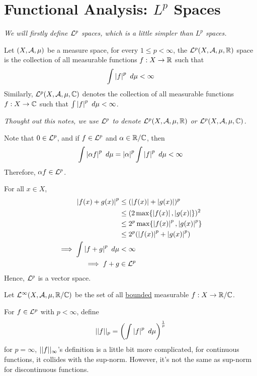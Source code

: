 \documentclass[11pt]{article}
\begin{document}
	\section{Functional Analysis: $L^p$ Spaces}
	\emph{We will firstly define $\mathcal{{L}}^p$ spaces, which is a little simpler than $L^p$ spaces.}
	\begin{definition}
		Let $(X, \mathcal{{A}}, \mu)$ be a measure space, for every $1 \leq p < \infty$, the $\mathcal{{L}}^p(X, \mathcal{{A}}, \mu, \mathbb{R})$ space is the collection of all measurable functions $f: X \to \mathbb{R}$ such that
		\begin{align}
			\int \left \vert {f} \right \vert^p\ d\mu < \infty
		\end{align}
		Similarly, $\mathcal{{L}}^p(X, \mathcal{{A}}, \mu, \mathbb{C})$ denotes the collection of all measurable functions $f: X \to \mathbb{C}$ such that $\int \left \vert {f} \right \vert^p\ d\mu < \infty$.
	\end{definition}
	\emph{Thought out this notes, we use $\mathcal{{L}}^p$ to denote $\mathcal{{L}}^p(X, \mathcal{{A}}, \mu, \mathbb{R})$ or $\mathcal{{L}}^p(X, \mathcal{{A}}, \mu, \mathbb{C})$.}
	\begin{proposition}
		Note that $0 \in \mathcal{{L}}^p$, and if $f \in \mathcal{{L}}^p$ and $\alpha \in \mathbb{R}/\mathbb{C}$, then
		\begin{align}
			\int \abs{\alpha f}^p\ d\mu = \abs{\alpha}^p \int \abs{f}^p\ d\mu < \infty
		\end{align}
		Therefore, $\alpha f \in \mathcal{{L}}^p$.
		
		For all $x \in X$,
		\begin{align}
			\left \vert {f(x) + g(x)} \right \vert^p &\leq (\left \vert {f(x)} \right \vert + \left \vert {g(x)} \right \vert)^p \\
			&\leq (2 \max\{\left \vert {f(x)} \right \vert, \left \vert {g(x)} \right \vert\})^2 \\
			&\leq 2^p \max\{\left \vert {f(x)} \right \vert^p, \left \vert {g(x)} \right \vert^p\} \\
			&\leq 2^p (\left \vert {f(x)} \right \vert^p + \left \vert {g(x)} \right \vert^p) \\
			\implies \int \left \vert {f+g} \right \vert^p\ d\mu &< \infty \\
			\implies f + g &\in \mathcal{{L}}^p
		\end{align}
		Hence, $\mathcal{{L}}^p$ is a vector space.
	\end{proposition}
	
	\begin{definition}
		Let $\mathcal{{L}}^\infty(X, \mathcal{{A}}, \mu, \mathbb{R}/\mathbb{C})$ be the set of all \ul{bounded} measurable $f: X \to \mathbb{R}/\mathbb{C}$.
	\end{definition}
	
	\begin{definition}
		For $f \in \mathcal{{L}}^p$ with $p < \infty$, define
		\begin{align}
			\vert \vert {f} \vert \vert_p = \left(\int \left \vert {f} \right \vert^p\ d\mu \right)^{\frac{1}{p}}
		\end{align}
		for $p = \infty$, $\vert \vert {f} \vert \vert_\infty$'s definition is a little bit more complicated, for continuous functions, it collides with the sup-norm. However, it's not the same as sup-norm for discontinuous functions.
	\end{definition}
	
\end{document}
